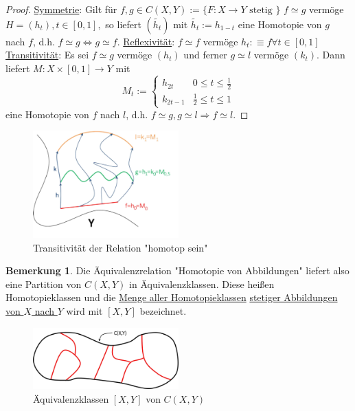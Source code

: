 \documentclass[a4paper,11pt,notitlepage]{report}
\theoremstyle{definition}
\newtheorem{remark}{Bemerkung}[chapter]
\begin{document}
\begin{proof}
	\underline{Symmetrie}:
	Gilt für $f,g \in C(X,Y) := \{F \colon X \rightarrow Y \text{ stetig } \}$ $f \simeq g$ vermöge $H=(h_t), t \in [0,1],$ so liefert $(\tilde{h_t})$ mit $\tilde{h_t}:=h_{1-t}$ eine Homotopie von $g$ nach $f$, d.h. $f \simeq g \Leftrightarrow g \simeq f$.
	\newline
	\underline{Reflexivität}:
	$f \simeq f$ vermöge $h_t : \equiv f \forall t \in [0,1]$
	\newline
	\underline{Transitivität}:
	Es sei $f \simeq g$ vermöge $(h_t)$ und ferner $g \simeq l$ vermöge $(k_t)$.
	Dann liefert $M \colon X \times [0,1] \rightarrow Y$ mit
	$$M_t := \begin{cases} h_{2t} & 0 \leq t \leq \frac{1}{2} \\
	k_{2t-1} & \frac{1}{2} \leq t \leq 1
	\end{cases}$$
	eine Homotopie von $f$ nach $l$, d.h. $f \simeq g, g \simeq l \Rightarrow f \simeq l$.
\end{proof}

\begin{figure}[h]
\centering
\includegraphics[width=0.5\textwidth]{images/Homotopie_Transitivitaet.png}
\caption{Transitivität der Relation "homotop sein"}
\end{figure}

\begin{remark}
Die Äquivalenzrelation "Homotopie von Abbildungen" liefert also eine Partition von $C(X,Y)$ in Äquivalenzklassen. Diese heißen Homotopieklassen und die \underline{Menge aller Homotopieklassen} \underline{stetiger Abbildungen} \underline{von $X$ nach $Y$} wird mit $[X,Y]$ bezeichnet.
\begin{figure}[h]
\centering
\includegraphics[width=0.5\textwidth]{images/Aequivalenzklassen.png}
\caption{Äquivalenzklassen $[X,Y]$ von $C(X,Y)$}
\end{figure}
\end{remark}
\end{document}
